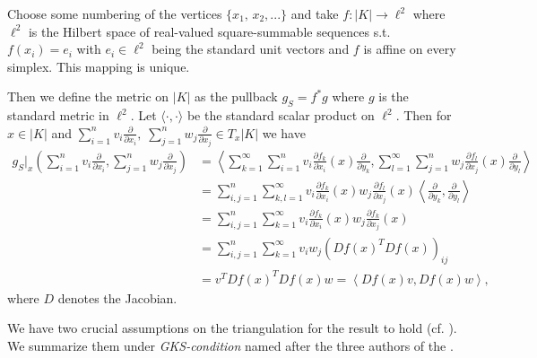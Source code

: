 \documentclass[12pt,a4paper]{article}
\theoremstyle{definition}
\begin{document}
Choose some numbering of the vertices $\{ x_1,\, x_2, ... \}$ and
take $f: |K| \rightarrow \ell^2$ where $\ell^2$ is the 
Hilbert space of real-valued square-summable sequences s.t. $f(x_i) = e_i$ 
with $e_i \in \ell^2$ being the standard unit vectors and $f$ is affine on 
every simplex. This mapping is unique.%

Then we define the metric on $|K|$ as the pullback $g_S = f^*g$ 
where $g$ is the standard metric in $\ell^2$. Let $\langle \cdot , 
\cdot \rangle$ be the standard scalar product on $\ell^2$. Then for $x \in |K|$ 
and $\sum_{i=1}^n v_i \frac{\partial}{\partial x_i}, \; 
\sum_{j=1}^n w_j \frac{\partial}{\partial x_j} \in T_x |K|$ we have 
\begin{align*}
g_S|_x\left(\sum_{i=1}^n v_i \frac{\partial}{\partial x_i}, 
\sum_{j=1}^n w_j \frac{\partial}{\partial x_j}\right) &= 
\left\langle \sum_{k=1}^\infty \sum_{i=1}^n v_i 
\frac{\partial f_k}{\partial x_i} (x)
\frac{\partial }{\partial y_k}, 
\sum_{l=1}^\infty \sum_{j=1}^n w_j \frac{\partial f_l}{\partial x_j} (x)
\frac{\partial }{\partial y_l} \right\rangle \\   
&= \sum_{i,j=1}^n \sum_{k,l=1}^\infty v_i \frac{\partial f_k}{\partial x_i} (x)
w_j \frac{\partial f_l}{\partial x_j} (x) 
\left\langle \frac{\partial }{\partial y_k}, \frac{\partial }{\partial y_l} 
\right\rangle\\
&= \sum_{i,j=1}^n \sum_{k=1}^\infty v_i \frac{\partial f_k}{\partial x_i} (x)
w_j \frac{\partial f_k}{\partial x_j} (x)\\
&= \sum_{i,j=1}^n \sum_{k=1}^\infty v_i w_j \left( Df(x)^T Df(x) \right)_{ij} \\
&= v^T Df(x)^T Df(x) w = \left\langle Df(x) v, Df(x) w \right\rangle,
\end{align*}
where $D$ denotes the Jacobian.

We have two crucial assumptions on the triangulation for the result to hold 
(cf. \cite[p.194]{goldshtein}). We summarize them under 
\textit{GKS-condition} named after the three authors of the \cite{goldshtein}.
\end{document}
